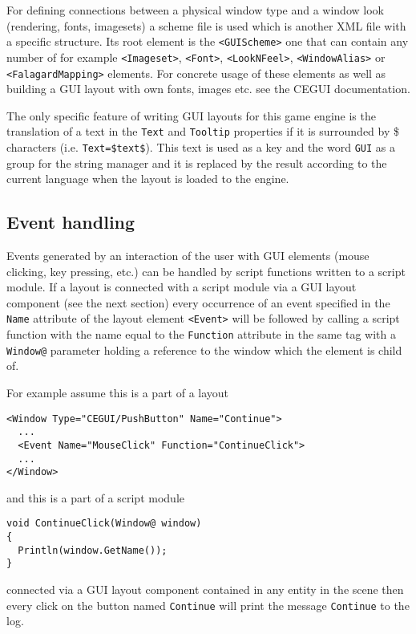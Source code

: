 For defining connections between a physical window type and a window look (rendering, fonts, imagesets) a scheme file is used which is another XML file with a specific structure. Its root element is the \verb/<GUIScheme>/ one that can contain any number of for example \verb/<Imageset>/, \verb/<Font>/, \verb/<LookNFeel>/, \verb/<WindowAlias>/ or \verb/<FalagardMapping>/ elements. For concrete usage of these elements as well as building a GUI layout with own fonts, images etc. see the CEGUI documentation.

The only specific feature of writing GUI layouts for this game engine is the translation of a text in the \verb/Text/ and \verb/Tooltip/ properties if it is surrounded by \$ characters (i.e. \verb/Text=$text$/). This text is used as a key and the word \verb/GUI/ as a group for the string manager and it is replaced by the result according to the current language when the layout is loaded to the engine.

\subsection{Event handling}
\label{sub:gui-event}

Events generated by an interaction of the user with GUI elements (mouse clicking, key pressing, etc.) can be handled by script functions written to a script module. If a layout is connected with a script module via a GUI layout component (see the next section) every occurrence of an event specified in the \verb/Name/ attribute of the layout element \verb/<Event>/ will be followed by calling a script function with the name equal to the \verb/Function/ attribute in the same tag with a \verb/Window@/ parameter holding a reference to the window which the element is child of.

For example assume this is a part of a layout

\begin{verbatim}
<Window Type="CEGUI/PushButton" Name="Continue">
  ...
  <Event Name="MouseClick" Function="ContinueClick">
  ...
</Window>
\end{verbatim}

\noindent and this is a part of a script module

\begin{verbatim}
void ContinueClick(Window@ window)
{
  Println(window.GetName());
}
\end{verbatim}

\noindent connected via a GUI layout component contained in any entity in the scene then every click on the button named \verb/Continue/ will print the message \verb/Continue/ to the log.

